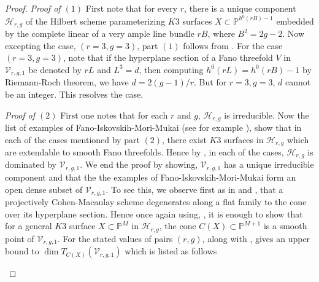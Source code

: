 \documentclass[11pt,twoside]{amsart}
\theoremstyle{plain}
\numberwithin{equation}{section}
\theoremstyle{definition}
\begin{document}
\begin{proof}
  \noindent\textit{Proof of $(1)$} First note that for every $r$, there is a unique component $\mathcal{H}_{r,g}$ of the Hilbert scheme parameterizing $K3$ surfaces $X \subset \mathbb{P}^{h^0(rB)-1}$ embedded by the complete linear of a very ample line bundle $rB$, where $B^2 = 2g-2$. Now excepting the case, $(r = 3, g = 3)$, part $(1)$ follows from . For the case $(r=3, g=3)$, note that if the hyperplane section of a Fano threefold $V$ in  $\mathcal{V}_{r,g,1}$ be denoted by $rL$ and $L^3 = d$, then computing $h^0(rL) = h^0(rB)-1$ by Riemann-Roch theorem, we have $d = 2(g-1)/r$. But for $r = 3, g = 3$, $d$ cannot be an integer. This resolves the case. \par
  \textit{Proof of $(2)$} First one notes that for each $r$ and $g$, $\mathcal{H}_{r,g}$ is irreducible. Now the list of examples of Fano-Iskovskih-Mori-Mukai (see for example \cite[Table $3.1$]{CLM98}), show that in each of the cases mentioned by part $(2)$, there exist $K3$ surfaces in $\mathcal{H}_{r,g}$ which are extendable to smooth Fano threefolds. Hence by , in each of the cases, $\mathcal{H}_{r,g}$ is dominated by $\mathcal{V}_{r,g,1}$. We end the proof by showing, $\mathcal{V}_{r,g,1}$ has a unique irreducible component and that the the examples of Fano-Iskovskih-Mori-Mukai form an open dense subset of $\mathcal{V}_{r,g,1}$.  To see this, we observe first as in \cite{CLM93} and \cite{CLM98}, that a projectively Cohen-Macaulay scheme degenerates along a flat family to the cone over its hyperplane section. Hence once again using, , it is enough to show that for a general $K3$ surface $X \subset \mathbb{P}^{M}$ in $\mathcal{H}_{r,g}$, the cone $C(X) \subset \mathbb{P}^{M+1}$ is a smooth point of $\mathcal{V}_{r,g,1}$. For the stated values of pairs $(r,g)$, 
   along with , gives an upper bound to $\operatorname{dim}T_{C(X)}(\mathcal{V}_{r,g,1})$ which is listed as follows 
  \begin{enumerate}



\end{enumerate}
\end{proof}
\end{document}
